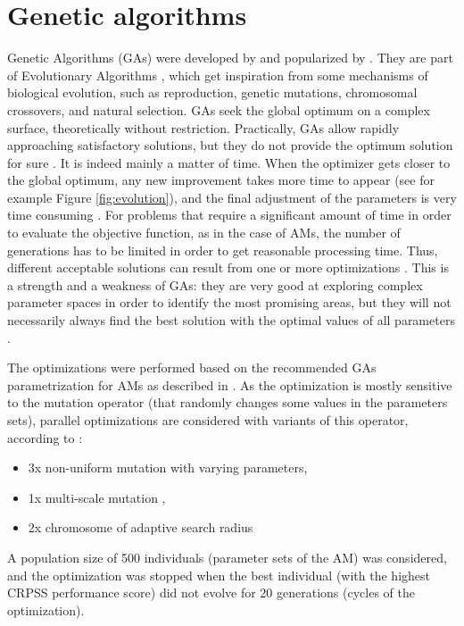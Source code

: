 \documentclass[5p]{elsarticle}
\begin{document}
\section{Genetic algorithms}
\label{sec:gas}

Genetic Algorithms (GAs) were developed by \citet{Holland1992b} and popularized by \citet{Goldberg1989}. They are part of Evolutionary Algorithms \citep{Back1993b, Schwefel1993}, which get inspiration from some mechanisms of biological evolution, such as reproduction, genetic mutations, chromosomal crossovers, and natural selection. GAs seek the global optimum on a complex surface, theoretically without restriction. Practically, GAs allow rapidly approaching satisfactory solutions, but they do not provide the optimum solution for sure \citep{Zitzler2004a}. It is indeed mainly a matter of time. When the optimizer gets closer to the global optimum, any new improvement takes more time to appear (see for example Figure \ref{fig:evolution}), and the final adjustment of the parameters is very time consuming \citep{Back1993a}. For problems that require a significant amount of time in order to evaluate the objective function, as in the case of AMs, the number of generations has to be limited in order to get reasonable processing time. Thus, different acceptable solutions can result from one or more optimizations \citep{Holland1992b}. This is a strength and a weakness of GAs: they are very good at exploring complex parameter spaces in order to identify the most promising areas, but they will not necessarily always find the best solution with the optimal values of all parameters \citep{Holland1992b}.

The optimizations were performed based on the recommended GAs parametrization for AMs as described in \citet{Horton2016a}. As the optimization is mostly sensitive to the mutation operator (that randomly changes some values in the parameters sets), parallel optimizations are considered with variants of this operator, according to \citet{Horton2016a}:

\begin{itemize}
	\item 3x non-uniform mutation \citep{Michalewicz1996} with varying parameters,
	\item 1x multi-scale mutation \citep{Horton2016a},
	\item 2x chromosome of adaptive search radius \citep{Horton2016a}
\end{itemize}

A population size of 500 individuals (parameter sets of the AM) was considered, and the optimization was stopped when the best individual (with the highest CRPSS performance score) did not evolve for 20 generations (cycles of the optimization).
\end{document}
